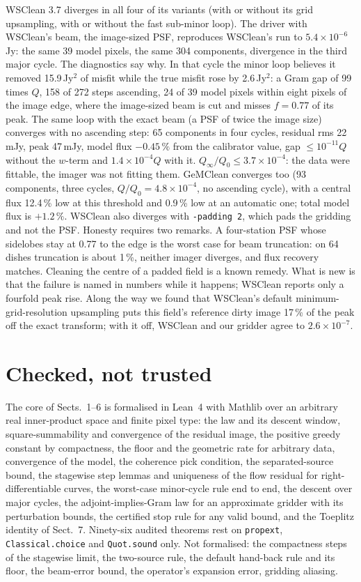 \documentclass[twocolumn,10pt]{article}
\theoremstyle{remark}
\newcommand{\Qinf}{Q_\infty}
\begin{document}
WSClean 3.7 diverges in all four of its variants (with or without its grid upsampling, with or without the fast sub-minor loop). The driver with WSClean's beam, the image-sized PSF, reproduces WSClean's run to $5.4\times10^{-6}$\,Jy: the same 39 model pixels, the same 304 components, divergence in the third major cycle. The diagnostics say why. In that cycle the minor loop believes it removed 15.9\,Jy$^2$ of misfit while the true misfit rose by 2.6\,Jy$^2$: a Gram gap of 99 times $Q$, 158 of 272 steps ascending, 24 of 39 model pixels within eight pixels of the image edge, where the image-sized beam is cut and misses $f=0.77$ of its peak. The same loop with the exact beam (a PSF of twice the image size) converges with no ascending step: 65 components in four cycles, residual rms 22\,mJy, peak 47\,mJy, model flux $-0.45\,\%$ from the calibrator value, gap $\le10^{-11}Q$ without the $w$-term and $1.4\times10^{-4}Q$ with it. $\Qinf/Q_0\le3.7\times10^{-4}$: the data were fittable, the imager was not fitting them. GeMClean converges too (93 components, three cycles, $Q/Q_0=4.8\times10^{-4}$, no ascending cycle), with a central flux 12.4\,\% low at this threshold and 0.9\,\% low at an automatic one; total model flux is $+1.2\,\%$. WSClean also diverges with \texttt{-padding 2}, which pads the gridding and not the PSF. Honesty requires two remarks. A four-station PSF whose sidelobes stay at 0.77 to the edge is the worst case for beam truncation: on 64 dishes truncation is about 1\,\%, neither imager diverges, and flux recovery matches. Cleaning the centre of a padded field is a known remedy. What is new is that the failure is named in numbers while it happens; WSClean reports only a fourfold peak rise. Along the way we found that WSClean's default minimum-grid-resolution upsampling puts this field's reference dirty image 17\,\% of the peak off the exact transform; with it off, WSClean and our gridder agree to $2.6\times10^{-7}$.

\section{Checked, not trusted}

The core of Sects.~1--6 is formalised in Lean~4 with Mathlib over an arbitrary real inner-product space and finite pixel type: the law and its descent window, square-summability and convergence of the residual image, the positive greedy constant by compactness, the floor and the geometric rate for arbitrary data, convergence of the model, the coherence pick condition, the separated-source bound, the stagewise step lemmas and uniqueness of the flow residual for right-differentiable curves, the worst-case minor-cycle rule end to end, the descent over major cycles, the adjoint-implies-Gram law for an approximate gridder with its perturbation bounds, the certified stop rule for any valid bound, and the Toeplitz identity of Sect.~7. Ninety-six audited theorems rest on \texttt{propext}, \texttt{Classical.choice} and \texttt{Quot.sound} only. Not formalised: the compactness steps of the stagewise limit, the two-source rule, the default hand-back rule and its floor, the beam-error bound, the operator's expansion error, gridding aliasing.
\end{document}
